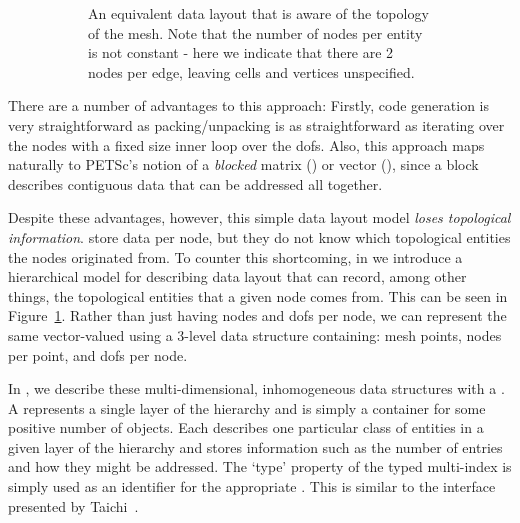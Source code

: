 \begin{figure}
\begin{subfigure}{0.48\textwidth}
    \caption{
      An equivalent data layout that is aware of the topology of the mesh.
      Note that the number of nodes per entity is not constant - here we indicate that there are 2 nodes per edge, leaving cells and vertices unspecified.
    }
    \label{fig:vdat_pyop3}
  \end{subfigure}
  \caption{}
  \label{fig:vdat_comparison}
\end{figure}

There are a number of advantages to this approach:
Firstly, code generation is very straightforward as packing/unpacking is as straightforward as iterating over the nodes with a fixed size inner loop over the \glspl{dof}.
Also, this approach maps naturally to PETSc's notion of a \textit{blocked} matrix () or vector (), since a block describes contiguous data that can be addressed all together.

Despite these advantages, however, this simple data layout model \textit{loses topological information}.
  store data per node, but they do not know which topological entities the nodes originated from.
To counter this shortcoming, in  we introduce a hierarchical model for describing data layout that can record, among other things, the topological entities that a given node comes from.
This can be seen in Figure~\ref{fig:vdat_pyop3}.
Rather than just having nodes and \glspl{dof} per node, we can represent the same vector-valued  using a 3-level data structure containing: mesh points, nodes per point, and \glspl{dof} per node.

In , we describe these multi-dimensional, inhomogeneous data structures with a .
A  represents a single layer of the hierarchy and is simply a container for some positive number of  objects.
Each  describes one particular class of entities in a given layer of the hierarchy and stores information such as the number of entries and how they might be addressed.
The `type' property of the typed multi-index is simply used as an identifier for the appropriate .
This is similar to the interface presented by Taichi~\cite{huTaichiLanguageHighperformance2019}. %

